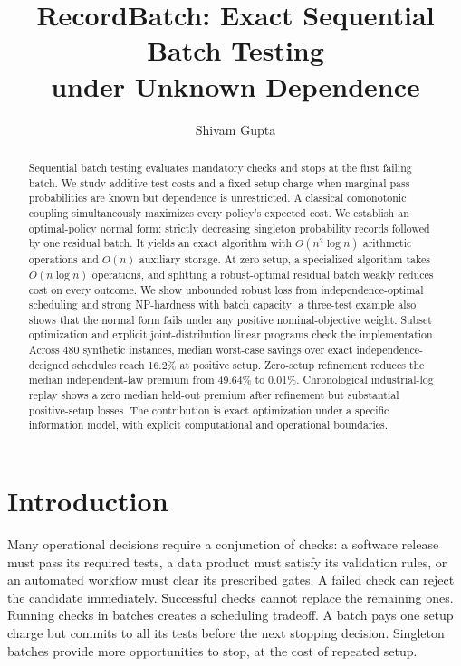 \documentclass[runningheads]{llncs}
\begin{document}
\raggedbottom
\title{RecordBatch: Exact Sequential Batch Testing\\under Unknown Dependence}
\author{Shivam Gupta}
\maketitle
\begin{abstract}
Sequential batch testing evaluates mandatory checks and stops at the first
failing batch. We study additive test costs and a fixed setup charge when
marginal pass probabilities are known but dependence is unrestricted.
A classical comonotonic coupling simultaneously maximizes every policy's
expected cost. We establish an optimal-policy normal form: strictly decreasing
singleton probability records followed by one residual batch. It yields an
exact algorithm with $O(n^2\log n)$ arithmetic operations and $O(n)$ auxiliary
storage. At zero setup, a specialized algorithm takes $O(n\log n)$ operations,
and splitting a robust-optimal residual batch weakly reduces cost on every
outcome. We show unbounded robust loss from independence-optimal scheduling
and strong NP-hardness with batch capacity; a three-test example also shows
that the normal form fails under any positive nominal-objective weight.
Subset optimization and explicit joint-distribution linear programs check
the implementation. Across 480 synthetic instances, median worst-case savings
over exact independence-designed schedules reach 16.2\% at positive setup.
Zero-setup refinement reduces the median independent-law premium from 49.64\%
to 0.01\%. Chronological industrial-log replay shows a zero median held-out
premium after refinement but substantial positive-setup losses. The contribution
is exact optimization under a specific information model, with explicit
computational and operational boundaries.
\end{abstract}

\section{Introduction}
Many operational decisions require a conjunction of checks: a software release
must pass its required tests, a data product must satisfy its validation rules,
or an automated workflow must clear its prescribed gates. A failed check can
reject the candidate immediately. Successful checks cannot replace the remaining
ones. Running checks in batches creates a scheduling tradeoff. A batch pays one
setup charge but commits to all its tests before the next stopping decision.
Singleton batches provide more opportunities to stop, at the cost of repeated
setup.
\end{document}
